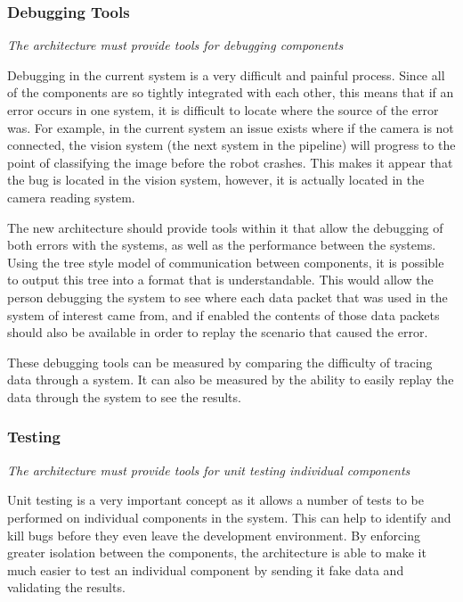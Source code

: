 \documentclass[english,12pt]{scrartcl}
\newcommand{\requirement}[1]{\textit{#1}}
\begin{document}
			\subsubsection{Debugging Tools}
				\requirement{The architecture must provide tools for debugging components}
	
				Debugging in the current system is a very difficult and painful process. Since all of
				the components are so tightly integrated with each other, this means that if an error
				occurs in one system, it is difficult to locate where the source of the error was. For
				example, in the current system an issue exists where if the camera is not connected, the
				vision system (the next system in the pipeline) will progress to the point of
				classifying the image before the robot crashes. This makes it appear that the bug is
				located in the vision system, however, it is actually located in the camera reading
				system.
	
				The new architecture should provide tools within it that allow the debugging of both
				errors with the systems, as well as the performance between the systems. Using the tree
				style model of communication between components, it is possible to output this tree into
				a format that is understandable. This would allow the person debugging the system to see
				where each data packet that was used in the system of interest came from, and if enabled
				the contents of those data packets should also be available in order to replay the
				scenario that caused the error.
	
				These debugging tools can be measured by comparing the difficulty of tracing data through a system. It can also be measured by the ability to easily replay the data through the system to see the results.

			\subsubsection{Testing}
				\requirement{The architecture must provide tools for unit testing individual components}
	
				Unit testing is a very important concept as it allows a number of tests to be performed
				on individual components in the system. This can help to identify and kill bugs before
				they even leave the development environment. By enforcing greater isolation between the
				components, the architecture is able to make it much easier to test an individual
				component by sending it fake data and validating the results.
	
\end{document}
